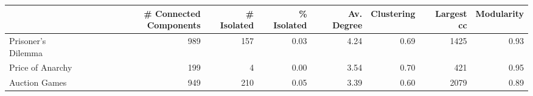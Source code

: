 \begin{tabular}{lrrrrrrr}
\toprule
{} &  \# Connected Components &  \# Isolated &  \% Isolated &  Av. Degree &  Clustering &  Largest cc &  Modularity \\
\midrule
Prisoner's Dilemma &                     989 &         157 &        0.03 &        4.24 &        0.69 &        1425 &        0.93 \\
Price of Anarchy   &                     199 &           4 &        0.00 &        3.54 &        0.70 &         421 &        0.95 \\
Auction Games      &                     949 &         210 &        0.05 &        3.39 &        0.60 &        2079 &        0.89 \\
\bottomrule
\end{tabular}
